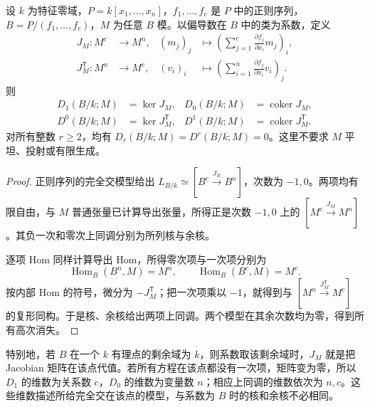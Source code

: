 \begin{proposition}\label{b3:prop:C-aq-complete-intersection}
	设 \(k\) 为特征零域，\(P=k[x_1,\ldots,x_n]\)，\(f_1,\ldots,f_c\) 是 \(P\) 中的正则序列，\(B=P/(f_1,\ldots,f_c)\)，\(M\) 为任意 \(B\) 模。以偏导数在 \(B\) 中的类为系数，定义
	\[
		\begin{aligned}
			J_M:M^c&\longrightarrow M^n,&(m_j)_j&\longmapsto\left(\sum_{j=1}^c\frac{\partial f_j}{\partial x_i}m_j\right)_i,\\
			J_M^{\mathsf T}:M^n&\longrightarrow M^c,&(v_i)_i&\longmapsto\left(\sum_{i=1}^n\frac{\partial f_j}{\partial x_i}v_i\right)_j.
		\end{aligned}
	\]
	则
	\[
		\begin{aligned}
			D_1(B/k;M)&=\ker J_M,&D_0(B/k;M)&=\operatorname{coker}J_M,\\
			D^0(B/k;M)&=\ker J_M^{\mathsf T},&D^1(B/k;M)&=\operatorname{coker}J_M^{\mathsf T}.
		\end{aligned}
	\]
	对所有整数 \(r\ge2\)，均有 \(D_r(B/k;M)=D^r(B/k;M)=0\)。这里不要求 \(M\) 平坦、投射或有限生成。
\end{proposition}
\begin{proof}
	正则序列的完全交模型给出 \(L_{B/k}\simeq[B^c\xrightarrow{J_B}B^n]\)，次数为 \(-1,0\)。两项均有限自由，与 \(M\) 普通张量已计算导出张量，所得正是次数 \(-1,0\) 上的 \([M^c\xrightarrow{J_M}M^n]\)。其负一次和零次上同调分别为所列核与余核。

	逐项 Hom 同样计算导出 Hom，所得零次项与一次项分别为
	\[
		\operatorname{Hom}_B(B^n,M)=M^n,\qquad
		\operatorname{Hom}_B(B^c,M)=M^c.
	\]
	按内部 Hom 的符号，微分为 \(-J_M^{\mathsf T}\)；把一次项乘以 \(-1\)，就得到与 \([M^n\xrightarrow{J_M^{\mathsf T}}M^c]\) 的复形同构。于是核、余核给出两项上同调。两个模型在其余次数均为零，得到所有高次消失。
\end{proof}

特别地，若 \(B\) 在一个 \(k\) 有理点的剩余域为 \(k\)，则系数取该剩余域时，\(J_M\) 就是把 Jacobian 矩阵在该点代值。若所有方程在该点都没有一次项，矩阵变为零，所以 \(D_1\) 的维数为关系数 \(c\)，\(D_0\) 的维数为变量数 \(n\)；相应上同调的维数依次为 \(n,c\)。这些维数描述所给完全交在该点的模型，与系数为 \(B\) 时的核和余核不必相同。

